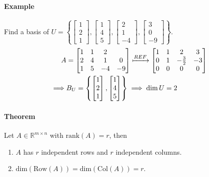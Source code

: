 \paragraph*{Example}
Find a basis of $U = \left\{\begin{bmatrix}
    1 \\ 2 \\ 1
\end{bmatrix}, \begin{bmatrix}
    1 \\ 4 \\ 5
\end{bmatrix}, \begin{bmatrix}
    2 \\ 1 \\ -4
\end{bmatrix}, \begin{bmatrix}
    3 \\ 0 \\ -9
\end{bmatrix}\right\}$.
\begin{align*}
    A &= \begin{bmatrix}
        1 & 1 & 2 \\ 2 & 4 & 1 & 0 \\ 1 & 5 & -4 & -9
    \end{bmatrix} \xmapsto{REF} \begin{bmatrix}
        1 & 1 & 2 & 3 \\ 0 & 1 & -\frac{3}{2} & -3 \\ 0 & 0 & 0 & 0
    \end{bmatrix}\\
    \implies & B_U = \left\{\begin{bmatrix}
        1 \\ 2 \\ 1
    \end{bmatrix}, \begin{bmatrix}
        1 \\ 4 \\ 5
    \end{bmatrix}\right\} \implies \dim{U} = 2
\end{align*}

\paragraph*{Theorem}
Let $A \in \mathbb{R}^{m \times n}$ with $\mathrm{rank}(A) = r$, then 
\begin{enumerate}
    \item $A$ has $r$ independent rows and $r$ independent columns.
    \item $\mathrm{dim}(\mathrm{Row}(A)) = \mathrm{dim}(\mathrm{Col}(A)) = r$.
\end{enumerate}

